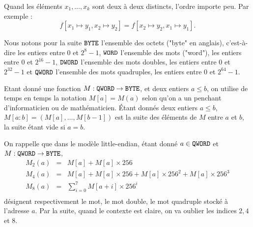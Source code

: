 \documentclass{book}
\newenvironment{formalisme}[1]{%
	\def\FrameCommand{\fboxrule=\FrameRule\fboxsep=\FrameSep \fcolorbox{red!10}{red!5}}%
	\MakeFramed {\advance\hsize-\width \FrameRestore}
	\noindent {\bf #1}\\
}%
{\endMakeFramed}
\newcommand{\BYTE}{{\tt BYTE}}
\newcommand{\WORD}{{\tt WORD}}
\newcommand{\DWORD}{{\tt DWORD}}
\newcommand{\QWORD}{{\tt QWORD}}
\begin{document}


Quand les éléments $x_1, \ldots, x_k$ sont deux à deux distincts, l'ordre importe peu. Par exemple : 
$$f[x_1\mapsto y_1, x_2 \mapsto y_2] = f[x_2\mapsto y_2, x_1 \mapsto y_1].$$

Nous notons pour la suite $\BYTE$ l'ensemble des octets ("byte" en anglais), c'est-à-dire les entiers entre $0$ et $2^8 -1$, $\WORD$ l'ensemble des mots ("word"), les entiers entre $0$ et $2^{16} - 1$,  $\DWORD$ l'ensemble des mots doubles, les entiers entre $0$ et $2^{32} -1$ et  $\QWORD$ l'ensemble des mots quadruples, les entiers entre $0$ et $2^{64} - 1$.

Etant donné une fonction $M: \QWORD \to \BYTE$, et deux entiers $a \leq b$, on utilise de temps en temps la notation $M[a] = M(a)$ selon qu'on a un penchant d'informaticien ou de mathématicien. \'Etant donnés deux entiers $a \leq b$, $M[a:b] = (M[a], \ldots, M[b-1])$ est la suite des éléments de $M$ entre $a$ et $b$, la suite étant vide si $a=b$. 

On rappelle que dans le modèle little-endian, étant donné $a\in \QWORD$ et $M: \QWORD\to \BYTE$, $$\begin{array}{rcl}
M_2(a) &=& M[a] + M[a] \times 256\\
M_4(a) &=& M[a] + M[a]\times 256 + M[a]\times 256^{2} +M[a]\times 256^{3} \\
M_8(a) &=& \sum_{i = 0}^7 M[a+i] \times {256}^{i}\\
\end{array}$$
désignent respectivement le mot, le mot double, le mot quadruple stocké à l'adresse $a$. Par la suite, quand le contexte est claire, on va oublier les indices $2, 4$ et $8$. 
\end{document}

